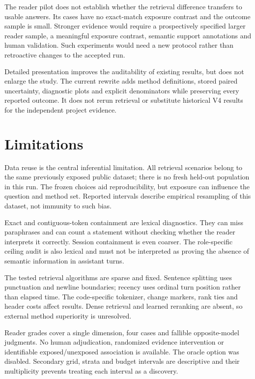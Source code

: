 \documentclass{article}
\begin{document}
The reader pilot does not establish whether the retrieval difference transfers to usable answers. Its cases have no exact-match exposure contrast and the outcome sample is small. Stronger evidence would require a prospectively specified larger reader sample, a meaningful exposure contrast, semantic support annotations and human validation. Such experiments would need a new protocol rather than retroactive changes to the accepted run.

Detailed presentation improves the auditability of existing results, but does not enlarge the study. The current rewrite adds method definitions, stored paired uncertainty, diagnostic plots and explicit denominators while preserving every reported outcome. It does not rerun retrieval or substitute historical V4 results for the independent project evidence.

\section{Limitations}
Data reuse is the central inferential limitation. All retrieval scenarios belong to the same previously exposed public dataset; there is no fresh held-out population in this run. The frozen choices aid reproducibility, but exposure can influence the question and method set. Reported intervals describe empirical resampling of this dataset, not immunity to such bias.

Exact and contiguous-token containment are lexical diagnostics. They can miss paraphrases and can count a statement without checking whether the reader interprets it correctly. Session containment is even coarser. The role-specific ceiling audit is also lexical and must not be interpreted as proving the absence of semantic information in assistant turns.

The tested retrieval algorithms are sparse and fixed. Sentence splitting uses punctuation and newline boundaries; recency uses ordinal turn position rather than elapsed time. The code-specific tokenizer, change markers, rank ties and header costs affect results. Dense retrieval and learned reranking are absent, so external method superiority is unresolved.

Reader grades cover a single dimension, four cases and fallible opposite-model judgments. No human adjudication, randomized evidence intervention or identifiable exposed/unexposed association is available. The oracle option was disabled. Secondary grid, strata and budget intervals are descriptive and their multiplicity prevents treating each interval as a discovery.
\end{document}
